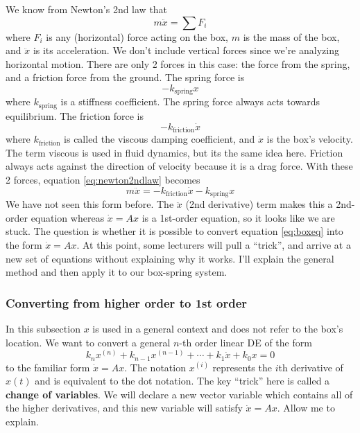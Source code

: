 \documentclass[11pt, oneside]{article}   	%
\begin{document}
We know from Newton's 2nd law that
\begin{equation} \label{eq:newton2ndlaw}
m \ddot{x} = \sum F_i
\end{equation}
where $F_i$ is any (horizontal) force acting on the box, $m$ is the mass of the box, and $\ddot{x}$ is its acceleration.
We don't include vertical forces since we're analyzing horizontal motion.
There are only 2 forces in this case: the force from the spring, and a friction force from the ground.
The spring force is
\begin{equation}
-k_\mathrm{spring} x
\end{equation}
where $k_\mathrm{spring}$ is a stiffness coefficient.
The spring force always acts towards equilibrium.
The friction force is
\begin{equation}
-k_\mathrm{friction} \dot{x}
\end{equation}
where $k_\mathrm{friction}$ is called the viscous damping coefficient, and $\dot{x}$ is the box's velocity.
The term viscous is used in fluid dynamics, but its the same idea here.
Friction always acts against the direction of velocity because it is a drag force.
With these 2 forces, equation \ref{eq:newton2ndlaw} becomes
\begin{equation} \label{eq:boxeq}
m \ddot{x} =
-k_\mathrm{friction} \dot{x}
-k_\mathrm{spring} x
\end{equation}
We have not seen this form before.
The $\ddot{x}$ (2nd derivative) term makes this a 2nd-order equation whereas $\dot{x} = Ax$ is a 1st-order equation, so it looks like we are stuck.
The question is whether it is possible to convert equation \ref{eq:boxeq} into the form $\dot{x} = Ax$.
At this point, some lecturers will pull a ``trick'', and arrive at a new set of equations without explaining why it works.
I'll explain the general method and then apply it to our box-spring system.

\subsubsection*{Converting from higher order to 1st order}

In this subsection $x$ is used in a general context and does not refer to the box's location.
We want to convert a general $n$-th order linear DE of the form
\begin{equation} \label{eq:nthOrderDE}
k_n x^{(n)}
+ k_{n-1} x^{(n-1)}
+ \cdots
+ k_{1} \dot{x}
+ k_{0} x
= 0
\end{equation}
to the familiar form $\dot{x} = Ax$.
The notation $x^{(i)}$ represents the $i$th derivative of $x(t)$ and is equivalent to the dot notation.
The key ``trick'' here is called a \textbf{change of variables}.
We will declare a new vector variable which contains all of the higher derivatives,
and this new variable will satisfy $\dot{x} = Ax$.
Allow me to explain.
\end{document}
